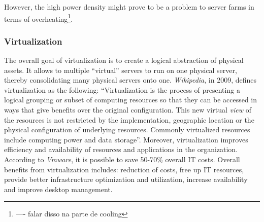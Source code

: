             However, the high power density might prove to be a problem to server farms in terms of overheating\footnote{---- falar disso na parte de cooling}.%
            
            \subsubsection*{Virtualization}
                The overall goal of virtualization is to create a logical abstraction of physical assets. It allows to multiple ``virtual'' servers to run on one physical server, thereby consolidating many physical servers onto one. \emph{Wikipedia}, in 2009, defines virtualization as the following: ``Virtualization is the process of presenting a logical grouping or subset of computing resources so that they can be accessed in ways that give benefits over the original configuration. This new virtual \emph{view} of the resources is not restricted by the implementation, geographic location or the physical configuration of underlying resources. Commonly virtualized resources include computing power and data storage''. Moreover, virtualization improves efficiency and availability of resources and applications in the organization. According to \emph{Vmware}, it is possible to save 50-70\% overall IT costs. Overall benefits from virtualization includes: reduction of costs, free up IT resources, provide better infrastructure optimization and utilization, increase availability and improve desktop management.
                
